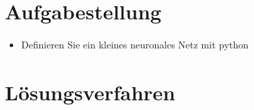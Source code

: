 \section{Aufgabestellung}
\begin{itemize}
    \item Definieren Sie ein kleines neuronales Netz mit python
\end{itemize}

\pagebreak

\section{Lösungsverfahren}
